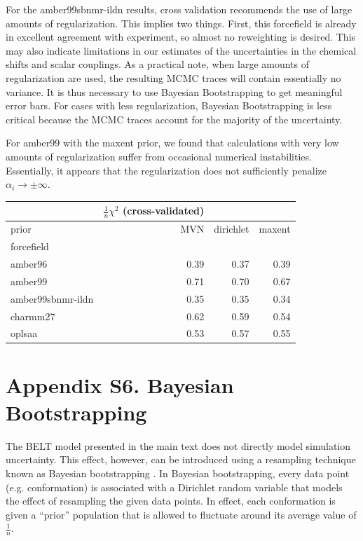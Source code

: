 \documentclass[12pt]{article}
\begin{document}
For the amber99sbnmr-ildn results, cross validation recommends the use of large amounts of regularization.  This implies two things.  First, this forcefield is already in excellent agreement with experiment, so almost no reweighting is desired.  This may also indicate limitations in our estimates of the uncertainties in the chemical shifts and scalar couplings.  As a practical note, when large amounts of regularization are used, the resulting MCMC traces will contain essentially no variance.  It is thus necessary to use Bayesian Bootstrapping to get meaningful error bars.  For cases with less regularization, Bayesian Bootstrapping is less critical because the MCMC traces account for the majority of the uncertainty.

For amber99 with the maxent prior, we found that calculations with very low amounts of regularization suffer from occasional numerical instabilities.  Essentially, it appears that the regularization does not sufficiently penalize $\alpha_i \rightarrow \pm \infty$.

\vspace{5mm}


\begin{tabular}{lrrr}
\toprule
{} &  $\frac{1}{n}\chi^2$ (cross-validated) & &          \\
\midrule
prior &       MVN &  dirichlet & maxent  \\
forcefield        &           &  &       \\
amber96           &      0.39 &       0.37 &    0.39 \\
amber99           &      0.71 &       0.70 &    0.67 \\
amber99sbnmr-ildn &      0.35 &       0.35 &    0.34 \\
charmm27          &      0.62 &       0.59 &    0.54 \\
oplsaa            &      0.53 &       0.57 &    0.55 \\
\bottomrule
\end{tabular}

\newpage

\section*{Appendix S6.  Bayesian Bootstrapping}

The BELT model presented in the main text does not directly model simulation uncertainty.  This effect, however, can be introduced using a resampling technique known as Bayesian bootstrapping \cite{rubin1981}.  In Bayesian bootstrapping, every data point (e.g. conformation) is associated with a Dirichlet random variable that models the effect of resampling the given data points.  In effect, each conformation is given a ``prior'' population that is allowed to fluctuate around its average value of $\frac{1}{n}$.  
\end{document}
